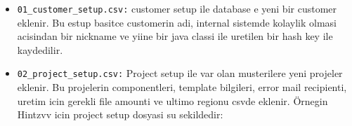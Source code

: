 \begin{itemize}
    \item \texttt{01\_customer\_setup.csv:} customer setup ile database e yeni bir customer eklenir. Bu estup basitce customerin adi, internal sistemde kolaylik olmasi acisindan bir nickname ve yiine bir java classi ile uretilen bir hash key ile kaydedilir. 
    \item \texttt{02\_project\_setup.csv:} Project setup ile var olan musterilere yeni projeler eklenir. Bu projelerin componentleri, template bilgileri, error mail recipienti, uretim icin gerekli file amounti ve ultimo regionu csvde eklenir. Örnegin Hintzvv icin project setup dosyasi su sekildedir:
\begin{table}[h]
\centering
\footnotesize
{}
\caption{CSV Tablosu}
\end{table}


\end{itemize}
